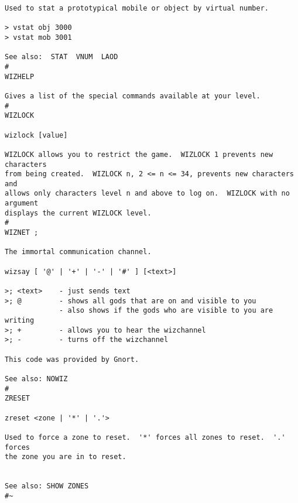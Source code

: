 \documentclass[11pt]{article}
\begin{document}
\begin{verbatim}
Used to stat a prototypical mobile or object by virtual number.

> vstat obj 3000
> vstat mob 3001

See also:  STAT  VNUM  LAOD
#
WIZHELP

Gives a list of the special commands available at your level.
#
WIZLOCK

wizlock [value]

WIZLOCK allows you to restrict the game.  WIZLOCK 1 prevents new characters
from being created.  WIZLOCK n, 2 <= n <= 34, prevents new characters and
allows only characters level n and above to log on.  WIZLOCK with no argument
displays the current WIZLOCK level.
#
WIZNET ;

The immortal communication channel.

wizsay [ '@' | '+' | '-' | '#' ] [<text>]

>; <text>    - just sends text
>; @         - shows all gods that are on and visible to you
             - also shows if the gods who are visible to you are writing
>; +         - allows you to hear the wizchannel
>; -         - turns off the wizchannel

This code was provided by Gnort.

See also: NOWIZ
#
ZRESET

zreset <zone | '*' | '.'>

Used to force a zone to reset.  '*' forces all zones to reset.  '.' forces
the zone you are in to reset.


See also: SHOW ZONES
#~
\end{verbatim}
\end{document}
